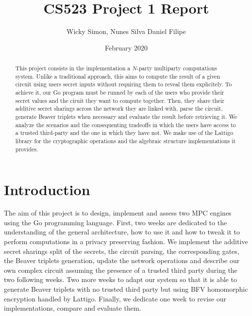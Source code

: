 \documentclass[10pt,conference]{IEEEtran}
\title{CS523 Project 1 Report}
\author{Wicky Simon, Nunes Silva Daniel Filipe}
\date{February 2020}
\begin{document}
\maketitle

\begin{abstract}
This project consists in the implementation a $N$-party multiparty
computations system. Unlike a traditional approach, this aims to compute
the result of a given circuit using users secret inputs without requiring
them to reveal them explicitely. To achieve it, our Go program must be runned
by each of the users who provide their secret values and the ciruit they
want to compute together. Then, they share their additive secret sharings
across the network they are linked with, parse the circuit, generate Beaver
triplets when necessary and evaluate the result before retrieving it.
We analyze the scenarios and the consequenting tradeoffs in which the users
have access to a trusted third-party and the one in which they have not. We
make use of the Lattigo library for the cryptographic operations and the
algebraic structure implementations it provides.

\end{abstract}
\section{Introduction}
The aim of this project is to design, implement and assess two MPC engines using
the Go programming language. First, two weeks are dedicated to the understanding
of the general architecture, how to use it and how to tweak it to perform
computations in a privacy preserving fashion. We implement the additive secret
sharings split of the secrets, the circuit parsing, the corresponding gates, the
Beaver triplets generation, update the network operations and describe our own
complex circuit assuming the presence of a trusted third party during the two
following weeks. Two more weeks to adapt our system so that it is able to
generate Beaver triplets with no trusted third party but using BFV homomorphic
encryption handled by Lattigo. Finally, we dedicate one week to revise our
implementations, compare and evaluate them.

\end{document}
